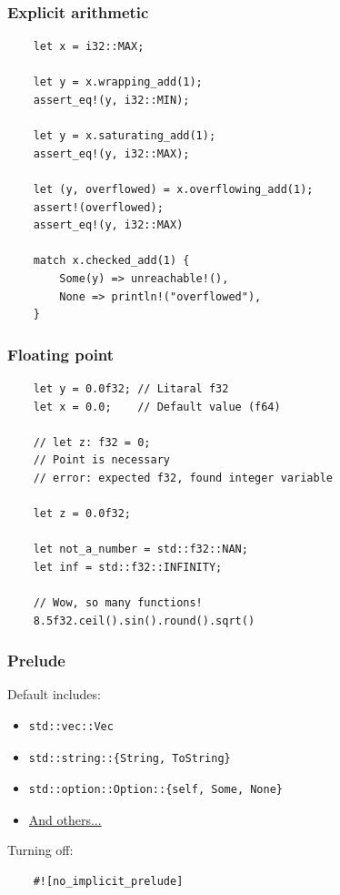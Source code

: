 \documentclass[aspectratio=1610,t]{beamer}
\begin{document}

\begin{frame}[fragile]
\frametitle{Explicit arithmetic}
\begin{verbatim}
    let x = i32::MAX;

    let y = x.wrapping_add(1);
    assert_eq!(y, i32::MIN);

    let y = x.saturating_add(1);
    assert_eq!(y, i32::MAX);

    let (y, overflowed) = x.overflowing_add(1);
    assert!(overflowed);
    assert_eq!(y, i32::MAX)

    match x.checked_add(1) {
        Some(y) => unreachable!(),
        None => println!("overflowed"),
    }
\end{verbatim}
\end{frame}


\begin{frame}[fragile]
\frametitle{Floating point}
\begin{verbatim}
    let y = 0.0f32; // Litaral f32
    let x = 0.0;    // Default value (f64)

    // let z: f32 = 0;
    // Point is necessary
    // error: expected f32, found integer variable
    
    let z = 0.0f32;

    let not_a_number = std::f32::NAN;
    let inf = std::f32::INFINITY;

    // Wow, so many functions!
    8.5f32.ceil().sin().round().sqrt()
\end{verbatim}
\end{frame}


\begin{frame}[fragile]
\frametitle{Prelude}
Default includes:
\begin{itemize}
    \item \begin{verbatim}
std::vec::Vec
    \end{verbatim}
    \item \begin{verbatim}
std::string::{String, ToString}
    \end{verbatim}
    \item \begin{verbatim}
std::option::Option::{self, Some, None}
    \end{verbatim}
    \item \href{https://doc.rust-lang.org/std/prelude/index.html#the-rust-prelude}{And others...}
\end{itemize}

Turning off:
\begin{verbatim}
    #![no_implicit_prelude]    
\end{verbatim}
\end{frame}
\end{document}

